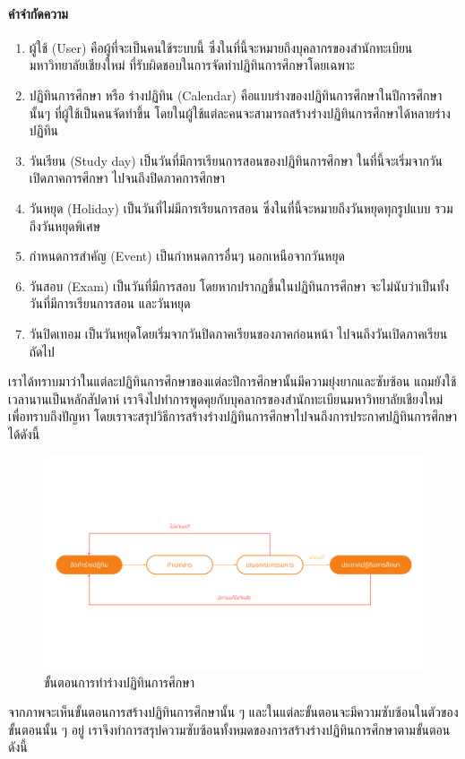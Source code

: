 \paragraph{คำจำกัดความ}
\begin{enumerate}
    \item ผู้ใช้ (User) คือผู้ที่จะเป็นคนใช้ระบบนี้ ซึ่งในที่นี้จะหมายถึงบุคลากรของสำนักทะเบียนมหาวิทยาลัยเชียงใหม่ ที่รับผิดชอบในการจัดทำปฏิทินการศึกษาโดยเฉพาะ
    \item ปฏิทินการศึกษา หรือ ร่างปฏิทิน (Calendar) คือแบบร่างของปฏิทินการศึกษาในปีการศึกษานั้นๆ ที่ผู้ใช้เป็นคนจัดทำขึ้น โดยในผู้ใช้แต่ละคนจะสามารถสร้างร่างปฏิทินการศึกษาได้หลายร่างปฏิทิน
    \item วันเรียน (Study day) เป็นวันที่มีการเรียนการสอนของปฏิทินการศึกษา ในที่นี้จะเริ่มจากวันเปิดภาคการศึกษา ไปจนถึงปิดภาคการศึกษา
    \item วันหยุด (Holiday) เป็นวันที่ไม่มีการเรียนการสอน ซึ่งในที่นี้จะหมายถึงวันหยุดทุกรูปแบบ รวมถึงวันหยุดพิเศษ
    \item กำหนดการสำคัญ (Event) เป็นกำหนดการอื่นๆ นอกเหนือจากวันหยุด
    \item วันสอบ (Exam) เป็นวันที่มีการสอบ โดยหากปรากฏขึ้นในปฏิทินการศึกษา จะไม่นับว่าเป็นทั้งวันที่มีการเรียนการสอน และวันหยุด
    \item วันปิดเทอม เป็นวันหยุดโดยเริ่มจากวันปิดภาคเรียนของภาคก่อนหน้า ไปจนถึงวันเปิดภาคเรียนถัดไป
\end{enumerate}

เราได้ทราบมาว่าในแต่ละปฏิทินการศึกษาของแต่ละปีการศึกษานั้นมีความยุ่งยากและซับซ้อน แถมยังใช้เวลานานเป็นหลักสัปดาห์ เราจึงไปทำการพูดคุยกับบุคลากรของสำนักทะเบียนมหาวิทยาลัยเชียงใหม่เพื่อทราบถึงปัญหา โดยเราจะสรุปวิธีการสร้างร่างปฏิทินการศึกษาไปจนถึงการประกาศปฏิทินการศึกษาได้ดังนี้

\begin{figure}[h]
    \centering
    \includegraphics[width=1\textwidth]{create-draft.png}
    \caption{ขั้นตอนการทำร่างปฏิทินการศึกษา}
    \label{fig:user-flow-create-draft}
\end{figure}
จากภาพจะเห็นขั้นตอนการสร้างปฏิทินการศึกษานั้น ๆ และในแต่ละขั้นตอนจะมีความซับซ้อนในตัวของขั้นตอนนั้น ๆ อยู่ เราจึงทำการสรุปความซับซ้อนทั้งหมดของการสร้างร่างปฏิทินการศึกษาตามขั้นตอนดังนี้

